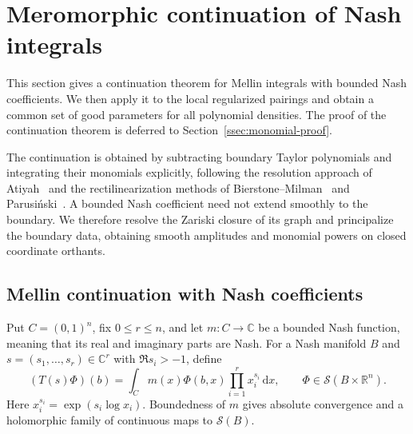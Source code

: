 \documentclass[a4paper,12pt]{amsart}
\numberwithin{equation}{section}
\theoremstyle{definition}
\theoremstyle{remark}
\newcommand{\R}{\mathbb R}
\newcommand{\C}{\mathbb C}
\newcommand{\mcS}{\mathcal S}
\newcommand{\dd}{\mathrm d}
\begin{document}
\section{Meromorphic continuation of Nash integrals}\label{sec:regularized}

This section gives a continuation theorem for Mellin integrals with bounded Nash coefficients. We then apply it to the local regularized pairings and obtain a common set of good parameters for all polynomial densities. The proof of the continuation theorem is deferred to Section~\ref{ssec:monomial-proof}.

The continuation is obtained by subtracting boundary Taylor polynomials and integrating their monomials explicitly, following the resolution approach of Atiyah~\cite{Ati70} and the rectilinearization methods of Bierstone--Milman~\cite{BM88} and Parusi\'nski~\cite{Par94}. A bounded Nash coefficient need not extend smoothly to the boundary. We therefore resolve the Zariski closure of its graph and principalize the boundary data, obtaining smooth amplitudes and monomial powers on closed coordinate orthants.

\subsection{Mellin continuation with Nash coefficients}

Put $C=(0,1)^n$, fix $0\le r\le n$, and let $m:C\to\C$ be a bounded Nash function, meaning that its real and imaginary parts are Nash. For a Nash manifold $B$ and $s=(s_1,\ldots,s_r)\in\C^r$ with $\Re s_i>-1$, define
\begin{equation}\label{eq:Nash-integral}
 (T(s)\Phi)(b)=\int_C m(x)\Phi(b,x)\prod_{i=1}^r x_i^{s_i}\,\dd x,
 \qquad \Phi\in\mcS(B\times\R^n).
\end{equation}
Here $x_i^{s_i}=\exp(s_i\log x_i)$. Boundedness of $m$ gives absolute convergence and a holomorphic family of continuous maps to $\mcS(B)$.
\end{document}
